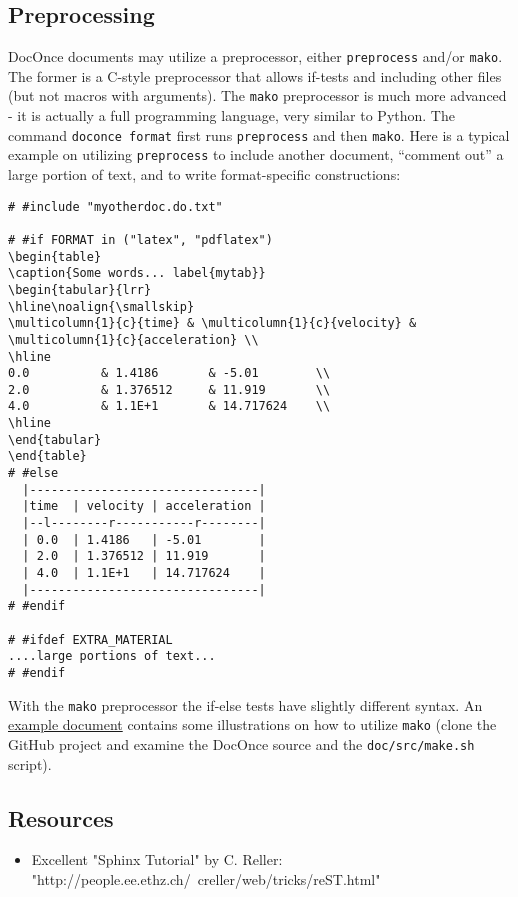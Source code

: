 \documentclass[%
oneside,                 %
final,                   %
10pt]{article}
\newcounter{doconce:movie:counter}
\begin{document}
\subsection{Preprocessing}
DocOnce documents may utilize a preprocessor, either \texttt{preprocess} and/or
\texttt{mako}. The former is a C-style preprocessor that allows if-tests
and including other files (but not macros with arguments).
The \texttt{mako} preprocessor is much more advanced - it is actually a full
programming language, very similar to Python.
The command \texttt{doconce format} first runs \texttt{preprocess} and then \texttt{mako}.
Here is a typical example on utilizing \texttt{preprocess} to include another
document, ``comment out'' a large portion of text, and to write format-specific
constructions:
\begin{Verbatim}[numbers=none,fontsize=\fontsize{9pt}{9pt},baselinestretch=0.95,xleftmargin=2mm]
# #include "myotherdoc.do.txt"

# #if FORMAT in ("latex", "pdflatex")
\begin{table}
\caption{Some words... label{mytab}}
\begin{tabular}{lrr}
\hline\noalign{\smallskip}
\multicolumn{1}{c}{time} & \multicolumn{1}{c}{velocity} & \multicolumn{1}{c}{acceleration} \\ 
\hline
0.0          & 1.4186       & -5.01        \\ 
2.0          & 1.376512     & 11.919       \\ 
4.0          & 1.1E+1       & 14.717624    \\ 
\hline
\end{tabular}
\end{table}
# #else
  |--------------------------------|
  |time  | velocity | acceleration |
  |--l--------r-----------r--------|
  | 0.0  | 1.4186   | -5.01        |
  | 2.0  | 1.376512 | 11.919       |
  | 4.0  | 1.1E+1   | 14.717624    |
  |--------------------------------|
# #endif

# #ifdef EXTRA_MATERIAL
....large portions of text...
# #endif

\end{Verbatim}

With the \texttt{mako} preprocessor the if-else tests have slightly different syntax.
An \href{{http://doconce.github.com/bioinf-py/}}{example document} contains
some illustrations on how to utilize \texttt{mako} (clone the GitHub project and
examine the DocOnce source and the \texttt{doc/src/make.sh} script).
\subsection{Resources}
\begin{itemize}
 \item Excellent "Sphinx Tutorial" by C. Reller: "http://people.ee.ethz.ch/~creller/web/tricks/reST.html"
\end{itemize}
\noindent
\end{document}

